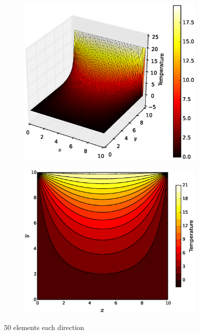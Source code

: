 \documentclass[10pt, a4paper]{article}
\begin{document}
\begin{figure}[H]
\centering
	\begin{subfigure}[H]{0.5\textwidth}
		\includegraphics[width=1.2\textwidth]{fig/figure_2.eps}
		\caption{}
		\label{fig:1}
	\end{subfigure}
	\begin{subfigure}[H]{0.3\textwidth}
		\includegraphics[width=\textwidth]{fig/figure_2.1.eps}
		\caption{}
		\label{fig:2}
	\end{subfigure}
	\caption{50 elements each direction}
	\label{fig:3_1}
\end{figure}
\end{document}
